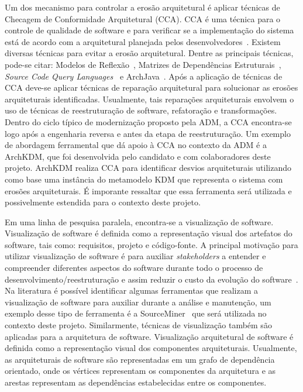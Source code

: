 \documentclass[12pt]{article}
\begin{document}
Um dos mecanismo para controlar a erosão arquitetural é aplicar técnicas de Checagem de Conformidade Arquitetural (CCA). CCA é uma técnica para o controle de qualidade de software e para verificar se a implementação do sistema está de acordo com a arquitetural planejada pelos desenvolvedores~\cite{Knodel_2007}. Existem diversas técnicas para evitar a erosão arquitetural. Dentre as principais técnicas, pode-se citar: Modelos de Reflexão~\cite{Murphy_1995}, Matrizes de Dependências Estruturais~\cite{Sangal_2005}, \textit{Source Code Query Languages}~\cite{Verbaere_2008} e ArchJava~\cite{ArchJava_2202}. Após a aplicação de técnicas de CCA deve-se aplicar técnicas de reparação arquitetural para solucionar as erosões arquiteturais identificadas. Usualmente, tais reparações arquiteturais envolvem o uso de técnicas de reestruturação de software, refatoração e transformações. Dentro do ciclo típico de modernização proposto pela ADM, a CCA encontra-se logo após a engenharia reversa e antes da etapa de reestruturação. Um exemplo de abordagem ferramental que dá apoio à CCA no contexto da ADM é a ArchKDM, que foi desenvolvida pelo candidato e com colaboradores deste projeto. ArchKDM realiza CCA para identificar desvios arquiteturais utilizando como base uma instância do metamodelo KDM que representa o sistema com erosões arquiteturais. É imporante ressaltar que essa ferramenta será utilizada e possivelmente estendida para o contexto deste projeto.

Em uma linha de pesquisa paralela, encontra-se a visualização de software. Visualização de software é definida como a representação visual dos artefatos do software, tais como: requisitos, projeto e código-fonte. A principal motivação para utilizar visualização de software é para auxiliar \textit{stakeholders} a entender e compreender diferentes aspectos do software durante todo o processo de desenvolvimento/reestruturação e assim reduzir o custo da evolução do software~\cite{Diehl_2007, Gallagher_2008}. Na literatura é possível identificar algumas ferramentas que realizam a visualização de software para auxiliar durante a análise e manutenção, um exemplo desse tipo de  ferramenta é a SourceMiner~\cite{source_miner_glauco} que será utilizada no contexto deste projeto. Similarmente, técnicas de visualização também são aplicadas para a arquitetura de software. Visualização arquitetural de software é definida como a representação visual dos componentes arquiteturais. Usualmente, as arquiteturais de software são representadas em um grafo de dependência orientado, onde os vértices representam os componentes da arquitetura e as arestas representam as dependências estabelecidas entre os componentes. 
\end{document}
